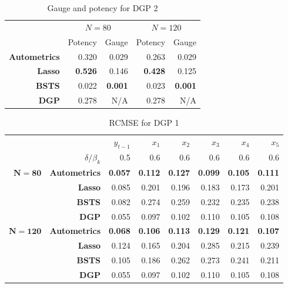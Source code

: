 \begin{table}[htbp]
  \centering

    \begin{tabular}{r|r|r|r|r}

         & \multicolumn{2}{|c|}{\textbf{$N=80$}} & \multicolumn{2}{|c}{\textbf{$N=120$}} \\
            & Potency           & Gauge           & Potency            & Gauge           \\
          \hline
    \textbf{Autometrics} & 0.320 & 0.029 & 0.263 & 0.029 \\
    \textbf{Lasso} & \textbf{0.526} & 0.146 & \textbf{0.428} & 0.125 \\
    \textbf{BSTS} & 0.022 & \textbf{0.001} & 0.023 & \textbf{0.001} \\
    \hline
    \textbf{DGP} & 0.278 & N/A   & 0.278 & N/A \\

    \end{tabular}%
      \caption{Gauge and potency for DGP 2}
  \label{DGP2GP}%
\end{table}%





\begin{table}[htbp]
  \centering

    \begin{tabular}{r|r|rrrrrr}

          &       & $y_{t-1}$ & $x_{1}$ & $x_{2}$ & $x_{3}$ & $x_{4}$ & $x_{5}$ \\

          & $\delta/\beta_{k}$ & 0.5   & 0.6   & 0.6   & 0.6   & 0.6   & 0.6 \\
          \hline
          \hline
$\bm{N=80}$ & \textbf{Autometrics} & \textbf{0.057} & \textbf{0.112} & \textbf{0.127} & \textbf{0.099} & \textbf{0.105} & \textbf{0.111} \\
    \textbf{} & \textbf{Lasso} & 0.085 & 0.201 & 0.196 & 0.183 & 0.173 & 0.201 \\
    \textbf{} & \textbf{BSTS} & 0.082 & 0.274 & 0.259 & 0.232 & 0.235 & 0.238 \\
    \hline
    \textbf{} & \textbf{DGP} & 0.055 & 0.097 & 0.102 & 0.110 & 0.105 & 0.108 \\
    \hline
    \hline
    $\bm{N=120}$ & \textbf{Autometrics} & \textbf{0.068} & \textbf{0.106} & \textbf{0.113} & \textbf{0.129} & \textbf{0.121} & \textbf{0.107 }\\
    \textbf{} & \textbf{Lasso} & 0.124 & 0.165 & 0.204 & 0.285 & 0.215 & 0.239 \\
    \textbf{} & \textbf{BSTS} & 0.105 & 0.186 & 0.262 & 0.273 & 0.241 & 0.211 \\
    \hline
    \textbf{} & \textbf{DGP} & 0.055 & 0.097 & 0.102 & 0.110 & 0.105 & 0.108 \\
        

    \end{tabular}%
      \caption{RCMSE for DGP 1}
  \label{DGP1CMSE}%
\end{table}%



